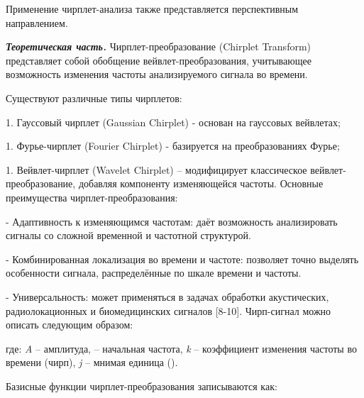 Применение чирплет-анализа также представляется перспективным
направлением.

\emph{{\bfseries Теоретическая часть.}} Чирплет-преобразование (Chirplet
Transform) представляет собой обобщение вейвлет-преобразования,
учитывающее возможность изменения частоты анализируемого сигнала во
времени.

Существуют различные типы чирплетов:


1. Гауссовый чирплет (Gaussian Chirplet) - основан на гауссовых
вейвлетах;

1. Фурье-чирплет (Fourier Chirplet) - базируется на преобразованиях
Фурье;

1. Вейвлет-чирплет (Wavelet Chirplet) -- модифицирует классическое
вейвлет-преобразование, добавляя компоненту изменяющейся частоты.
Основные преимущества чирплет-преобразования:


- Адаптивность к изменяющимся частотам: даёт возможность анализировать
сигналы со сложной временной и частотной структурой.

- Комбинированная локализация во времени и частоте: позволяет точно
выделять особенности сигнала, распределённые по шкале времени и
частоты.

- Универсальность: может применяться в задачах обработки акустических,
радиолокационных и биомедицинских сигналов {[}8-10{]}.
Чирп-сигнал можно описать следующим образом:


где: \emph{A} -- амплитуда,
--
начальная частота, \emph{k} -- коэффициент изменения частоты во времени
(чирп), \emph{j} -- мнимая единица
().

Базисные функции чирплет-преобразования записываются как:


